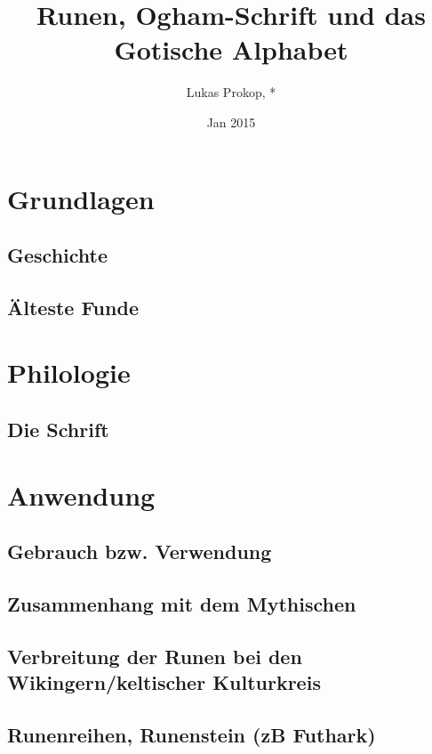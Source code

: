 \documentclass[a4paper]{article}
\author{Lukas Prokop, *}
\title{Runen, Ogham-Schrift und das Gotische Alphabet}
\date{Jan 2015}
\begin{document}
\maketitle
\tableofcontents

\section{Grundlagen}
\subsection{Geschichte}
\subsection{Älteste Funde}

\section{Philologie}
\subsection{Die Schrift}


\section{Anwendung}
\subsection{Gebrauch bzw. Verwendung}
\subsection{Zusammenhang mit dem Mythischen}
\subsection{Verbreitung der Runen bei den Wikingern/keltischer Kulturkreis}
\subsection{Runenreihen, Runenstein (zB Futhark)}
\end{document}
